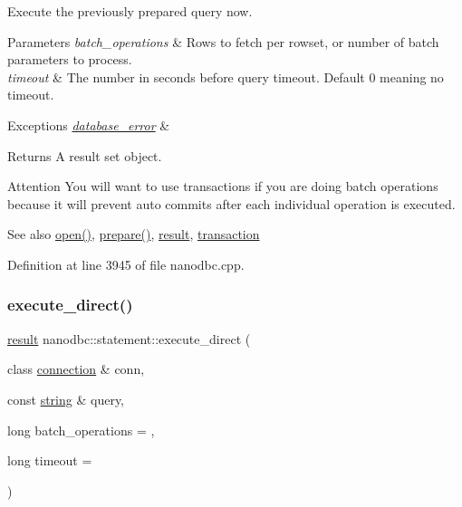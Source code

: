 Execute the previously prepared query now. 


\begin{DoxyParams}{Parameters}
{\em batch\+\_\+operations} & Rows to fetch per rowset, or number of batch parameters to process. \\
\hline
{\em timeout} & The number in seconds before query timeout. Default 0 meaning no timeout. \\
\hline
\end{DoxyParams}

\begin{DoxyExceptions}{Exceptions}
{\em \mbox{\hyperlink{classnanodbc_1_1database__error}{database\+\_\+error}}} & \\
\hline
\end{DoxyExceptions}
\begin{DoxyReturn}{Returns}
A result set object. 
\end{DoxyReturn}
\begin{DoxyAttention}{Attention}
You will want to use transactions if you are doing batch operations because it will prevent auto commits after each individual operation is executed. 
\end{DoxyAttention}
\begin{DoxySeeAlso}{See also}
\mbox{\hyperlink{classnanodbc_1_1statement_a473ec2d726f6d8acc42ce0f5f6d1b967}{open()}}, \mbox{\hyperlink{classnanodbc_1_1statement_a63b56d30a303014ce8f80df5e5b67dca}{prepare()}}, \mbox{\hyperlink{classnanodbc_1_1result}{result}}, \mbox{\hyperlink{classnanodbc_1_1transaction}{transaction}} 
\end{DoxySeeAlso}


Definition at line 3945 of file nanodbc.\+cpp.

\mbox{\label{classnanodbc_1_1statement_af070dc29a840854e261bda5761318cf0}} 
\subsubsection{\texorpdfstring{execute\_direct()}{execute\_direct()}}
{\footnotesize\ttfamily \mbox{\hyperlink{classnanodbc_1_1result}{result}} nanodbc\+::statement\+::execute\+\_\+direct (\begin{DoxyParamCaption}\item[{class \mbox{\hyperlink{classnanodbc_1_1connection}{connection}} \&}]{conn,  }\item[{const \mbox{\hyperlink{namespacenanodbc_abfc0ece56278e590911ec8352774c212}{string}} \&}]{query,  }\item[{long}]{batch\+\_\+operations = {},  }\item[{long}]{timeout = {} }\end{DoxyParamCaption})}



